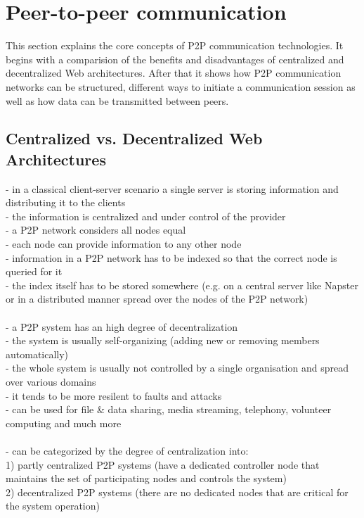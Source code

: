 
\section{Peer-to-peer communication}
\label{sec:p2p_communication}

This section explains the core concepts of \gls{P2P} communication technologies. It begins with a comparision of the benefits and disadvantages of centralized and decentralized Web architectures. After that it shows how \gls{P2P} communication networks can be structured, different ways to initiate a communication session as well as how data can be transmitted between peers.

\subsection{Centralized vs. Decentralized Web Architectures}

- in a classical client-server scenario a single server is storing information and distributing it to the clients \\
- the information is centralized and under control of the provider \\

- a P2P network considers all nodes equal \\
- each node can provide information to any other node \\
- information in a P2P network has to be indexed so that the correct node is queried for it \\
- the index itself has to be stored somewhere (e.g. on a central server like Napster or in a distributed manner spread over the nodes of the P2P network) \\
\\
- a P2P system has an high degree of decentralization \\
- the system is usually self-organizing (adding new or removing members automatically) \\
- the whole system is usually not controlled by a single organisation and spread over various domains \\
- it tends to be more resilent to faults and attacks \\
- can be used for file \& data sharing, media streaming, telephony, volunteer computing and much more \\
\\
- can be categorized by the degree of centralization into: \\
  1) partly centralized P2P systems (have a dedicated controller node that maintains the set of participating nodes and controls the system) \\
  2) decentralized P2P systems (there are no dedicated nodes that are critical for the system operation) \\
\\
\label{sec:central_decentral_arch}

